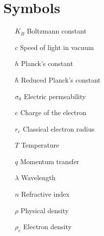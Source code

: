 \section*{Symbols}

\thispagestyle{empty}


\begin{itemize}
        \item[$K_B$] Boltzmann constant
        \item[$c$] Speed of light in vacuum        
        \item[$h$] Planck's constant  
        \item[$\hbar$] Reduced Planck's constant  
        \item[$\sigma_0$] Electric permeability  
        \item[$e$] Charge of the electron  
        \item[$r_e$] Classical electron radius  
        \item[$T$] Temperature  
        \item[$q$] Momentum transfer  
        \item[$\lambda$] Wavelength  
        \item[$n$] Refractive index
        \item[$\rho$] Physical density  
        \item[$\rho_e$] Electron density
\end{itemize}

